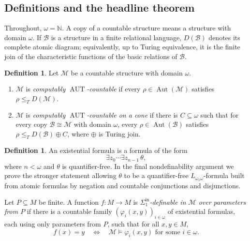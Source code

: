 \documentclass[12pt]{article}
\theoremstyle{definition}
\newtheorem{definition}[theorem]{Definition}
\theoremstyle{remark}
\newcommand{\Aut}{\operatorname{Aut}}
\begin{document}
\subsection{Definitions and the headline theorem}

Throughout, \(\omega=\mathbb N\).  A copy of a countable structure means a structure with domain \(\omega\).  If \(\mathcal B\) is a structure in a finite relational language, \(D(\mathcal B)\) denotes its complete atomic diagram; equivalently, up to Turing equivalence, it is the finite join of the characteristic functions of the basic relations of \(\mathcal B\).

\begin{definition}
Let \(\mathcal M\) be a countable structure with domain \(\omega\).
\begin{enumerate}
\item \(\mathcal M\) is \emph{computably \(\operatorname{AUT}\)-countable} if every \(\rho\in\Aut(\mathcal M)\) satisfies \(\rho\leq_T D(\mathcal M)\).
\item \(\mathcal M\) is \emph{computably \(\operatorname{AUT}\)-countable on a cone} if there is \(C\subseteq\omega\) such that for every copy \(\mathcal B\cong\mathcal M\) with domain \(\omega\), every \(\rho\in\Aut(\mathcal B)\) satisfies \(\rho\leq_T D(\mathcal B)\oplus C\), where \(\oplus\) is Turing join.
\end{enumerate}
\end{definition}

\begin{definition}
An existential formula is a formula of the form
\[
\exists z_0\cdots \exists z_{n-1}\,\theta,
\]
where \(n<\omega\) and \(\theta\) is quantifier-free.  In the final nondefinability argument we prove the stronger statement allowing \(\theta\) to be a quantifier-free \(L_{\omega_1\omega}\)-formula built from atomic formulas by negation and countable conjunctions and disjunctions.

Let \(P\subseteq M\) be finite.  A function \(f:M\to M\) is \emph{\(\Sigma^{\mathrm{in}}_1\)-definable in \(\mathcal M\) over parameters from \(P\)} if there is a countable family \((\varphi_i(x,y))_{i\in\omega}\) of existential formulas, each using only parameters from \(P\), such that for all \(x,y\in M\),
\[
f(x)=y
\quad\Longleftrightarrow\quad
\mathcal M\models \varphi_i(x,y)\text{ for some }i\in\omega.
\]
\end{definition}
\end{document}
